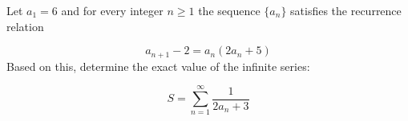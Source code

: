 Let $a_1 = 6$ and for every integer $n \ge 1$ the sequence $\{a_n\}$ satisfies the recurrence relation

\[a_{n+1} - 2 = a_n (2a_n + 5)\]Based on this, determine the exact value of the infinite series:

\[S = \sum_{n=1}^{\infty} \dfrac{1}{2a_n + 3} \]
